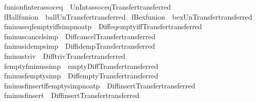 \begin{isabellebody}
\isamarkupfalse%
\ funion{\isacharunderscore}finter{\isacharunderscore}assoc{\isacharunderscore}eq\ {\isacharequal}\ Un{\isacharunderscore}Int{\isacharunderscore}assoc{\isacharunderscore}eq{\isacharbrackleft}Transfer{\isachardot}transferred{\isacharbrackright}\isanewline
{}\isamarkupfalse%
\ fBall{\isacharunderscore}funion\ {\isacharequal}\ ball{\isacharunderscore}Un{\isacharbrackleft}Transfer{\isachardot}transferred{\isacharbrackright}\isanewline
{}\isamarkupfalse%
\ fBex{\isacharunderscore}funion\ {\isacharequal}\ bex{\isacharunderscore}Un{\isacharbrackleft}Transfer{\isachardot}transferred{\isacharbrackright}\isanewline
{}\isamarkupfalse%
\ fminus{\isacharunderscore}eq{\isacharunderscore}fempty{\isacharunderscore}iff{\isacharbrackleft}simp{\isacharcomma}no{\isacharunderscore}atp{\isacharbrackright}\ {\isacharequal}\ Diff{\isacharunderscore}eq{\isacharunderscore}empty{\isacharunderscore}iff{\isacharbrackleft}Transfer{\isachardot}transferred{\isacharbrackright}\isanewline
{}\isamarkupfalse%
\ fminus{\isacharunderscore}cancel{\isacharbrackleft}simp{\isacharbrackright}\ {\isacharequal}\ Diff{\isacharunderscore}cancel{\isacharbrackleft}Transfer{\isachardot}transferred{\isacharbrackright}\isanewline
{}\isamarkupfalse%
\ fminus{\isacharunderscore}idemp{\isacharbrackleft}simp{\isacharbrackright}\ {\isacharequal}\ Diff{\isacharunderscore}idemp{\isacharbrackleft}Transfer{\isachardot}transferred{\isacharbrackright}\isanewline
{}\isamarkupfalse%
\ fminus{\isacharunderscore}triv\ {\isacharequal}\ Diff{\isacharunderscore}triv{\isacharbrackleft}Transfer{\isachardot}transferred{\isacharbrackright}\isanewline
{}\isamarkupfalse%
\ fempty{\isacharunderscore}fminus{\isacharbrackleft}simp{\isacharbrackright}\ {\isacharequal}\ empty{\isacharunderscore}Diff{\isacharbrackleft}Transfer{\isachardot}transferred{\isacharbrackright}\isanewline
{}\isamarkupfalse%
\ fminus{\isacharunderscore}fempty{\isacharbrackleft}simp{\isacharbrackright}\ {\isacharequal}\ Diff{\isacharunderscore}empty{\isacharbrackleft}Transfer{\isachardot}transferred{\isacharbrackright}\isanewline
{}\isamarkupfalse%
\ fminus{\isacharunderscore}finsertffempty{\isacharbrackleft}simp{\isacharcomma}no{\isacharunderscore}atp{\isacharbrackright}\ {\isacharequal}\ Diff{\isacharunderscore}insert{}{\isacharbrackleft}Transfer{\isachardot}transferred{\isacharbrackright}\isanewline
{}\isamarkupfalse%
\ fminus{\isacharunderscore}finsert\ {\isacharequal}\ Diff{\isacharunderscore}insert{\isacharbrackleft}Transfer{\isachardot}transferred{\isacharbrackright}\isanewline

\end{isabellebody}
